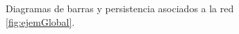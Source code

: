 \documentclass[12pt, a4paper, twoside]{book}
\numberwithin{equation}{section}
\theoremstyle{definition}
\newenvironment{ejem}
  {\pushQED{\qed}\renewcommand{\qedsymbol}{$\blacktriangleleft$}\ejemplo}
  {\popQED\endejemplo}
\theoremstyle{remark}
\theoremstyle{plain}
\begin{document}
\begin{ejem}
	\begin{figure}[!htbp]
			\begin{figure}[H]
			\end{figure}
		\endminipage
			\begin{figure}[H]
			\end{figure}
		\endminipage
		\caption{Diagramas de barras y persistencia asociados a la red 
		\ref{fig:ejemGlobal}.}
		\label{fig:ejemGlobalDiag}
	\end{figure}
	

\end{ejem}
\end{document}

